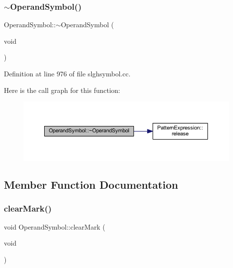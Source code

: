 \subsubsection{\texorpdfstring{$\sim$OperandSymbol()}{~OperandSymbol()}}
{\footnotesize\ttfamily Operand\+Symbol\+::$\sim$\+Operand\+Symbol (\begin{DoxyParamCaption}\item[{void}]{ }\end{DoxyParamCaption})\hspace{0.3cm}{\ttfamily [virtual]}}



Definition at line 976 of file slghsymbol.\+cc.

Here is the call graph for this function\+:
\nopagebreak
\begin{figure}[H]
\begin{center}
\leavevmode
\includegraphics[width=350pt]{class_operand_symbol_a1949a4b5a8e32481e7b4e01a7ff226b1_cgraph}
\end{center}
\end{figure}


\subsection{Member Function Documentation}
\mbox{\label{class_operand_symbol_ae0ccaa8ae25f40be2ac5420200fd899e}} 
\subsubsection{\texorpdfstring{clearMark()}{clearMark()}}
{\footnotesize\ttfamily void Operand\+Symbol\+::clear\+Mark (\begin{DoxyParamCaption}\item[{void}]{ }\end{DoxyParamCaption})\hspace{0.3cm}{\ttfamily [inline]}}



